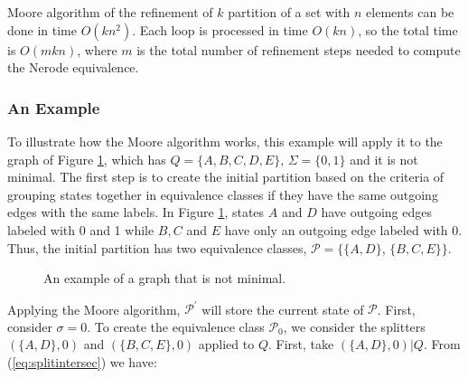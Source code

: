 {Moore algorithm of the refinement of $k$ partition of a set with $n$ elements can be done in time $O(kn^2)$. Each loop is processed in time $O(kn)$, so the total time is $O(m kn)$, where $m$ is the total number of refinement steps needed to compute the Nerode equivalence.

\subsubsection{An Example}

To illustrate how the Moore algorithm works, this example will apply it to the graph of Figure \ref{fig:moore_ex}, which has $Q = \{A, B, C, D, E\}$, $\Sigma = \{0, 1\}$ and it is not minimal. The first step is to create the initial partition based on the criteria of grouping states together in equivalence classes if they have the same outgoing edges with the same labels. In Figure \ref{fig:moore_ex}, states $A$ and $D$ have outgoing edges labeled with 0 and 1 while $B, C$ and $E$ have only an outgoing edge labeled with 0. Thus, the initial partition has two equivalence classes, $\mathcal{P} = \{\{A,D\}$,  $\{B,C,E\}\}$.

\begin{figure}
\centering
{}
\caption{An example of a graph that is not minimal.\label{fig:moore_ex}}
\end{figure}

Applying the Moore algorithm, $\mathcal{P}^{\prime}$ will store the current state of $\mathcal{P}$. First, consider $\sigma = 0$. To create the equivalence class $\mathcal{P}_0$, we consider the splitters $(\{A,D\},0)$ and $(\{B,C,E\},0)$ applied to $Q$. First, take $(\{A,D\},0)|Q$. From (\ref{eq:splitintersec}) we have:

}
